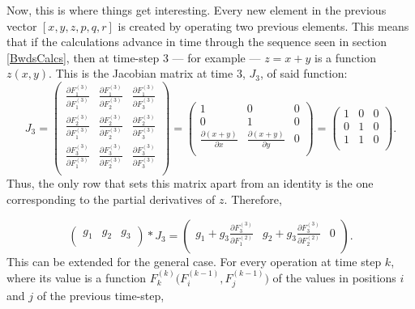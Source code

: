 \documentclass[titlepage]{article}
\theoremstyle{plain}
\theoremstyle{definition}
\begin{document}
		Now, this is where things get interesting. Every new element in the previous vector $[x,y,z,p,q,r]$ is created by operating two previous elements. This means that if the calculations advance in time through the sequence seen in section \ref{BwdsCalcs}, then at time-step 3 --- for example --- $z = x + y$ is a function $z(x,y)$. This is the Jacobian matrix at time $3$, $J_{3}$, of said function:
		$$
		J_{3}
		=
		\begin{pmatrix}
			\frac{\partial F^{(3)}_1}{\partial F^{(3)}_1} &
			\frac{\partial F^{(3)}_1}{\partial F^{(3)}_2} &
			\frac{\partial F^{(3)}_1}{\partial F^{(3)}_3} \\
			\frac{\partial F^{(3)}_2}{\partial F^{(3)}_1} &
			\frac{\partial F^{(3)}_2}{\partial F^{(3)}_2} &
			\frac{\partial F^{(3)}_2}{\partial F^{(3)}_3} \\
			\frac{\partial F^{(3)}_3}{\partial F^{(3)}_1} &
			\frac{\partial F^{(3)}_3}{\partial F^{(3)}_2} &
			\frac{\partial F^{(3)}_3}{\partial F^{(3)}_3} \\
		\end{pmatrix}=
		\begin{pmatrix}
		1 & 0 & 0 \\
		0 & 1 & 0 \\
		\frac{\partial (x+y)}{\partial x} & 
		\frac{\partial (x+y)}{\partial y} & 
		0 \\
		\end{pmatrix}
		=
		\begin{pmatrix}
		1 & 0 & 0 \\
		0 & 1 & 0 \\
		1 & 1 & 0 \\
		\end{pmatrix}.
		$$
		Thus, the only row that sets this matrix apart from an identity is the one corresponding to the partial derivatives of $z$. Therefore,
		
		$$\begin{pmatrix}
		g_{1} &
		g_{2} &
		g_{3} \\
		\end{pmatrix}
		*
		J_{3}
		=
		\begin{pmatrix}
			g_{1}+g_{3} \frac{\partial F^{(3)}_3}{\partial F^{(2)}_1} & 
			g_{2}+g_{3} \frac{\partial F^{(3)}_3}{\partial F^{(2)}_2} &
			0 \\
		\end{pmatrix}.
		$$
		This can be extended for the general case. For every operation at time step $k$, where its value is a function $F^{(k)}_k\big(F^{(k-1)}_i,F^{(k-1)}_j\big)$ of the values in positions $i$ and $j$ of the previous time-step,
		
\end{document}
